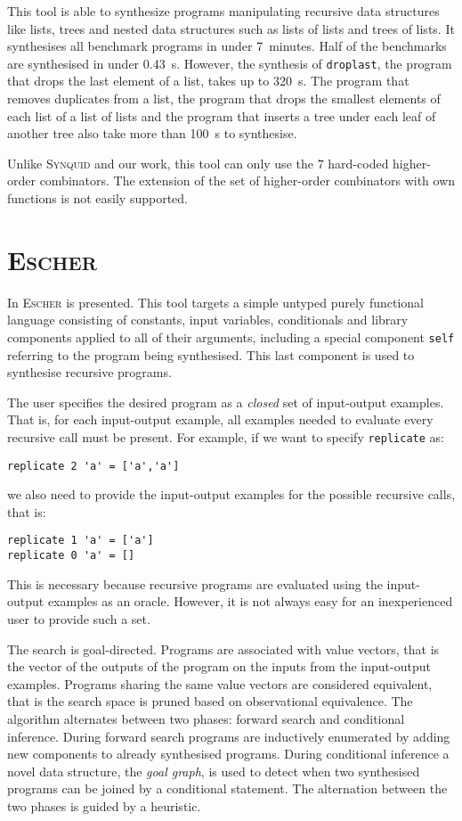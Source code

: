 This tool is able to synthesize programs manipulating recursive data structures like lists, trees and nested data structures such as lists of lists and trees of lists.
It synthesises all benchmark programs in under 7~minutes. Half of the benchmarks are synthesised in under \SI{0.43}{s}. However, the synthesis of \lstinline!droplast!, the program that drops the last element of a list, takes up to \SI{320}{s}. The program that removes duplicates from a list, the program that drops the smallest elements of each list of a list of lists and the program that inserts a tree under each leaf of another tree also take more than \SI{100}{s} to synthesise.

Unlike \textsc{Synquid} and our work, this tool can only use the $7$ hard-coded higher-order combinators. The extension of the set of higher-order combinators with own functions is not easily supported.


\section{\mdseries\textsc{Escher}}

In \cite{EscherPaper} \textsc{Escher} is presented. This tool targets a simple untyped purely functional language consisting of constants, input variables, conditionals and library components applied to all of their arguments, including a special component \lstinline!self! referring to the program being synthesised. This last component is used to synthesise recursive programs.

The user specifies the desired program as a \emph{closed} set of input-output examples. That is, for each input-output example, all examples needed to evaluate every recursive call must be present. For example, if we want to specify \lstinline!replicate! as:
\begin{lstlisting}[style=plain]
replicate 2 'a' = ['a','a']
\end{lstlisting}
we also need to provide the input-output examples for the possible recursive calls, that is:
\begin{lstlisting}[style=plain]
replicate 1 'a' = ['a']
replicate 0 'a' = []
\end{lstlisting}
This is necessary because recursive programs are evaluated using the input-output examples as an oracle. However, it is not always easy for an inexperienced user to provide such a set.

The search is goal-directed. Programs are associated with value vectors, that is the vector of the outputs of the program on the inputs from the input-output examples. Programs sharing the same value vectors are considered equivalent, that is the search space is pruned based on observational equivalence.
The algorithm alternates between two phases: forward search and conditional inference. During forward search programs are inductively enumerated by adding new components to already synthesised programs. During conditional inference a novel data structure, the \emph{goal graph}, is used to detect when two synthesised programs can be joined by a conditional statement. The alternation between the two phases is guided by a heuristic.

